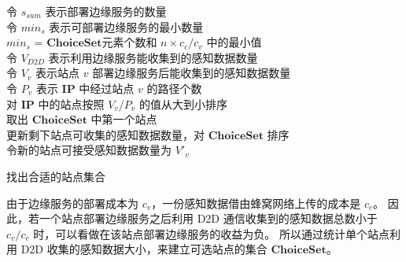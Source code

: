 \begin{algorithm}[!b]
\setstretch{\algostretch}
令 $s_{sum}$ 表示部署边缘服务的数量\\
令 $min_s$ 表示可部署边缘服务的最小数量\\
$min_s$ = $\boldsymbol{ChoiceSet}$元素个数和 $n \times c_c/c_v$ 中的最小值\\
令 $V_{D2D}$ 表示利用边缘服务能收集到的感知数据数量\\
令 $V_v$ 表示站点 $v$ 部署边缘服务后能收集到的感知数据数量\\
令 $P_v$ 表示 $\boldsymbol{IP}$ 中经过站点 $v$ 的路径个数\\
对 $\boldsymbol{IP}$ 中的站点按照 $V_v$/$P_v$ 的值从大到小排序\\
取出 $\boldsymbol{ChoiceSet}$ 中第一个站点\\
更新剩下站点可收集的感知数据数量，对 $\boldsymbol{ChoiceSet}$ 排序\\
令新的站点可接受感知数据数量为 $V'_v$\\
\caption{找出合适的站点集合}
\label{algo_choice}
\end{algorithm}

由于边缘服务的部署成本为 $c_v$，一份感知数据借由蜂窝网络上传的成本是  $c_c$。
因此，若一个站点部署边缘服务之后利用 D2D 通信收集到的感知数据总数小于 $c_v/c_c$ 时，可以看做在该站点部署边缘服务的收益为负。
所以通过统计单个站点利用 D2D 收集的感知数据大小，来建立可选站点的集合 $\boldsymbol{ChoiceSet}$。

